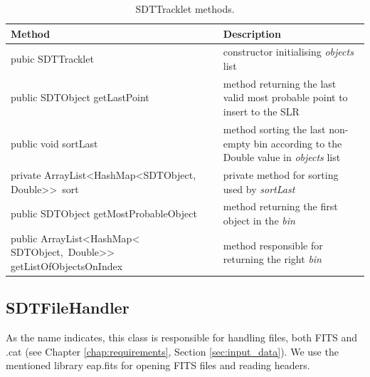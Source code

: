 \begin{table}[H]
\centering
\setlength{\extrarowheight}{2pt}
\begin{tabularx}{\textwidth}{|X|X|}
\hline
\textbf{Method} & \textbf{Description} \\ \hline
pubic \mbox{SDTTracklet} & constructor initialising \emph{objects} list \\ \hline
public SDTObject \mbox{getLastPoint} & method returning the last valid most probable point to insert to the SLR \\ \hline
public void \mbox{sortLast} & method sorting the last non-empty bin according to the Double value in \emph{objects} list \\ \hline
private \mbox{ArrayList<HashMap<SDTObject,} \mbox{Double>{}> sort} & private method for sorting used by \emph{sortLast} \\ \hline
public SDTObject \mbox{getMostProbableObject} & method returning the first object in the \emph{bin} \\ \hline
public \mbox{ArrayList<HashMap<} \mbox{SDTObject, Double>{}>{}} \mbox{getListOfObjectsOnIndex} & method responsible for returning the right \emph{bin} \\ \hline
\end{tabularx}
\caption{SDTTracklet methods.}
\label{tab:class_methods_T}
\end{table}

\newpage

\subsection{SDTFileHandler}\label{sec:file_handler}

	As the name indicates, this class is responsible for handling files, both FITS and .cat (see Chapter \ref{chap:requirements}, Section \ref{sec:input_data}). We use the mentioned library eap.fits for opening FITS files and reading headers.
	
